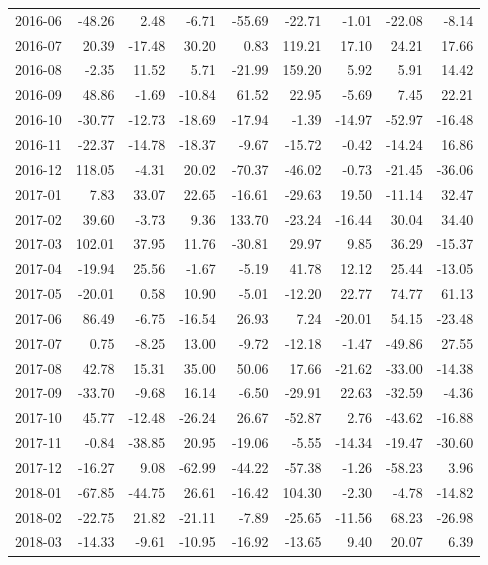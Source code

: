 \begin{table}[ht]
\begin{tabular}{lrrrrrrrr}
  2016-06 & -48.26 & 2.48 & -6.71 & -55.69 & -22.71 & -1.01 & -22.08 & -8.14 \\ 
  2016-07 & 20.39 & -17.48 & 30.20 & 0.83 & 119.21 & 17.10 & 24.21 & 17.66 \\ 
  2016-08 & -2.35 & 11.52 & 5.71 & -21.99 & 159.20 & 5.92 & 5.91 & 14.42 \\ 
  2016-09 & 48.86 & -1.69 & -10.84 & 61.52 & 22.95 & -5.69 & 7.45 & 22.21 \\ 
  2016-10 & -30.77 & -12.73 & -18.69 & -17.94 & -1.39 & -14.97 & -52.97 & -16.48 \\ 
  2016-11 & -22.37 & -14.78 & -18.37 & -9.67 & -15.72 & -0.42 & -14.24 & 16.86 \\ 
  2016-12 & 118.05 & -4.31 & 20.02 & -70.37 & -46.02 & -0.73 & -21.45 & -36.06 \\ 
  2017-01 & 7.83 & 33.07 & 22.65 & -16.61 & -29.63 & 19.50 & -11.14 & 32.47 \\ 
  2017-02 & 39.60 & -3.73 & 9.36 & 133.70 & -23.24 & -16.44 & 30.04 & 34.40 \\ 
  2017-03 & 102.01 & 37.95 & 11.76 & -30.81 & 29.97 & 9.85 & 36.29 & -15.37 \\ 
  2017-04 & -19.94 & 25.56 & -1.67 & -5.19 & 41.78 & 12.12 & 25.44 & -13.05 \\ 
  2017-05 & -20.01 & 0.58 & 10.90 & -5.01 & -12.20 & 22.77 & 74.77 & 61.13 \\ 
  2017-06 & 86.49 & -6.75 & -16.54 & 26.93 & 7.24 & -20.01 & 54.15 & -23.48 \\ 
  2017-07 & 0.75 & -8.25 & 13.00 & -9.72 & -12.18 & -1.47 & -49.86 & 27.55 \\ 
  2017-08 & 42.78 & 15.31 & 35.00 & 50.06 & 17.66 & -21.62 & -33.00 & -14.38 \\ 
  2017-09 & -33.70 & -9.68 & 16.14 & -6.50 & -29.91 & 22.63 & -32.59 & -4.36 \\ 
  2017-10 & 45.77 & -12.48 & -26.24 & 26.67 & -52.87 & 2.76 & -43.62 & -16.88 \\ 
  2017-11 & -0.84 & -38.85 & 20.95 & -19.06 & -5.55 & -14.34 & -19.47 & -30.60 \\ 
  2017-12 & -16.27 & 9.08 & -62.99 & -44.22 & -57.38 & -1.26 & -58.23 & 3.96 \\ 
  2018-01 & -67.85 & -44.75 & 26.61 & -16.42 & 104.30 & -2.30 & -4.78 & -14.82 \\ 
  2018-02 & -22.75 & 21.82 & -21.11 & -7.89 & -25.65 & -11.56 & 68.23 & -26.98 \\ 
  2018-03 & -14.33 & -9.61 & -10.95 & -16.92 & -13.65 & 9.40 & 20.07 & 6.39 \\ 

\end{tabular}
\end{table}
